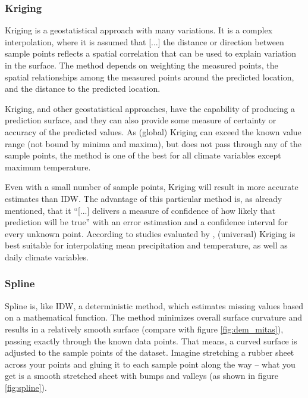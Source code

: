\subsubsection{Kriging}

Kriging is a geostatistical approach with many variations. It is a complex interpolation, where it is assumed that \ldq{}[...] the distance or direction between sample points reflects a spatial correlation that can be used to explain variation in the surface\rdq{}. \cite[p.11605]{elumalai_spatial_2017} The method depends on weighting the measured points, the spatial relationships among the measured points around the predicted location, and the distance to the predicted location. \cite{wenjing_cao_study_2009}

Kriging, and other geostatistical approaches, have the capability of producing a prediction surface, and they can also provide some measure of certainty or accuracy of the predicted values. \cite{samanta_interpolation_2012} As (global) Kriging can exceed the known value range (not bound by minima and maxima), but does not pass through any of the sample points, the method is one of the best for all climate variables except maximum temperature. \cite{gis_resources_choosing_2013}

Even with a small number of sample points, Kriging will result in more accurate estimates than IDW. \cite{lam_spatial_2009} The advantage of this particular method is, as already mentioned, that it “[...] delivers a measure of confidence of how likely that prediction will be true” with an error estimation and a confidence interval for every unknown point. \cite{lam_spatial_2009} According to studies evaluated by \citeauthor{hofstra_comparison_2008}, (universal) Kriging is best suitable for interpolating mean precipitation and temperature, as well as daily climate variables. 

\subsubsection{Spline}

Spline is, like IDW, a deterministic method, which estimates missing values based on a mathematical function. The method minimizes overall \ldq{}surface curvature\rdq{} and results in a relatively smooth surface (compare with figure \ref{fig:dem_mitas}), passing exactly through the known data points. \cite{samanta_interpolation_2012} That means, a curved surface is adjusted to the sample points of the dataset. \ldq{}Imagine stretching a rubber sheet across your points and gluing it to each sample point along the way -- what you get is a smooth stretched sheet with bumps and valleys\rdq{} (as shown in figure \ref{fig:spline}). \cite{wasser_going_2020}

